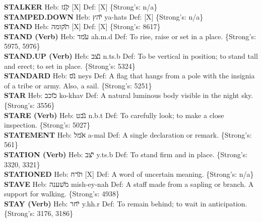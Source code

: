 {\textbf{STALKER} Heb: {\large\H קנז} {[}X{]} Def: {[}X{]} \{Strong's: n/a\}\hfill{}\\

\textbf{STAMPED.DOWN} Heb: {\large\H יהץ} ya-hats Def: {[}X{]} \{Strong's: n/a\}\hfill{}\\

\textbf{STAND} Heb: {\large\H תקומה} {[}X{]} Def: {[}X{]} \{Strong's: 8617\}\hfill{}\\

\textbf{STAND (Verb)} Heb: {\large\H עמד} ah.m.d Def: To rise, raise or set in a place. \{Strong's: 5975, 5976\}\hfill{}\\

\textbf{STAND.UP (Verb)} Heb: {\large\H נצב} n.ts.b Def: To be vertical in position; to stand tall and erect; to set in place. \{Strong's: 5324\}\hfill{}\\

\textbf{STANDARD} Heb: {\large\H נס} neys Def: A flag that hangs from a pole with the insignia of a tribe or army. Also, a sail. \{Strong's: 5251\}\hfill{}\\

\textbf{STAR} Heb: {\large\H כוכב} ko-khav Def: A natural luminous body visible in the night sky. \{Strong's: 3556\}\hfill{}\\

\textbf{STARE (Verb)} Heb: {\large\H נבט} n.b.t Def: To carefully look; to make a close inspection. \{Strong's: 5027\}\hfill{}\\

\textbf{STATEMENT} Heb: {\large\H אמל} a-mal Def: A single declaration or remark. \{Strong's: 561\}\hfill{}\\

\textbf{STATION (Verb)} Heb: {\large\H יצב} y.ts.b Def: To stand firm and in place. \{Strong's: 3320, 3321\}\hfill{}\\

\textbf{STATIONED} Heb: {\large\H תרח} {[}X{]} Def: A word of uncertain meaning. \{Strong's: n/a\}\hfill{}\\

\textbf{STAVE} Heb: {\large\H משענה} mish-ey-nah Def: A staff made from a sapling or branch. A support for walking. \{Strong's: 4938\}\hfill{}\\

\textbf{STAY (Verb)} Heb: {\large\H יחר} y.hh.r Def: To remain behind; to wait in anticipation. \{Strong's: 3176, 3186\}\hfill{}\\

}
